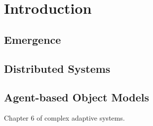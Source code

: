 \chapter{Introduction}
\label{ch:introduction}

\section{Emergence}


\section{Distributed Systems}
\section{Agent-based Object Models}
Chapter 6 of complex adaptive systems.



